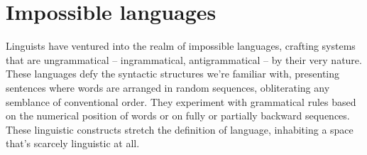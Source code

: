 
\chapter{Impossible languages}

Linguists have ventured into the realm of impossible languages, crafting systems that are ungrammatical -- ingrammatical, antigrammatical -- by their very nature. These languages defy the syntactic structures we're familiar with, presenting sentences where words are arranged in random sequences, obliterating any semblance of conventional order. They experiment with grammatical rules based on the numerical position of words or on fully or partially backward sequences. These linguistic constructs stretch the definition of language, inhabiting a space that's scarcely linguistic at all.

